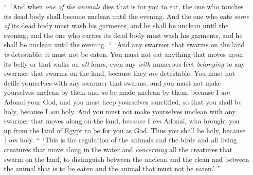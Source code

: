 \begin{biblechapter}
\verse “ ‘And when \textit{one of the animals} dies that is for you to eat, the one who touches its dead body shall become unclean until the evening.
\verse And the one who eats \textit{some of} its dead body must wash his garments, and he shall be unclean until the evening; and the one who carries its dead body must wash his garments, and he shall be unclean until the evening.
\verse “ ‘And any swarmer that swarms on the land \textit{is} detestable; it must not be eaten.
\verse You must not eat anything that moves upon its belly or that walks on \textit{all} fours, even any \textit{with} numerous feet \textit{belonging} to any swarmer that swarms on the land, because they \textit{are} detestable.
\verse You must not defile yourselves with any swarmer that swarms, and you must not make yourselves unclean by them and \textit{so} be made unclean by them,
\verse because I \textit{am} Adonai your God, and you must keep yourselves sanctified, so that you shall be holy, because I \textit{am} holy. And you must not make yourselves unclean with any swarmer that moves along on the land,
\verse because I \textit{am} Adonai, who brought you up from the land of Egypt to be for you as God. Thus you shall be holy, because I \textit{am} holy.
\verse “ ‘This is the regulation of the animals and the birds and all living creatures that move along in the water and \textit{concerning} all the creatures that swarm on the land,
\verse to distinguish between the unclean and the clean and between the animal that is to be eaten and the animal that must not be eaten.’ ”
\end{biblechapter}


